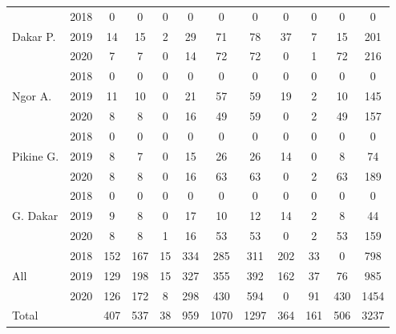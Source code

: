 \begin{tabular}{llcccc|cccccc}
\hline \multirow{3}{*}{Dakar P.} & 2018&           0&           0&           0&           0&           0&           0&           0&           0&           0&           0\\
& 2019      &          14&          15&           2&          29&          71&          78&          37&           7&          15&         201\\
& 2020      &           7&           7&           0&          14&          72&          72&           0&           1&          72&         216\\
\hline \multirow{3}{*}{Ngor A.} & 2018&           0&           0&           0&           0&           0&           0&           0&           0&           0&           0\\
& 2019      &          11&          10&           0&          21&          57&          59&          19&           2&          10&         145\\
& 2020      &           8&           8&           0&          16&          49&          59&           0&           2&          49&         157\\
\hline \multirow{3}{*}{Pikine G.} & 2018&           0&           0&           0&           0&           0&           0&           0&           0&           0&           0\\
& 2019      &           8&           7&           0&          15&          26&          26&          14&           0&           8&          74\\
& 2020      &           8&           8&           0&          16&          63&          63&           0&           2&          63&         189\\
\hline \multirow{3}{*}{G. Dakar} & 2018&           0&           0&           0&           0&           0&           0&           0&           0&           0&           0\\
& 2019      &           9&           8&           0&          17&          10&          12&          14&           2&           8&          44\\
& 2020      &           8&           8&           1&          16&          53&          53&           0&           2&          53&         159\\
\hline \multirow{3}{*}{All} & 2018&         152&         167&          15&         334&         285&         311&         202&          33&           0&         798\\
& 2019      &         129&         198&          15&         327&         355&         392&         162&          37&          76&         985\\
& 2020      &         126&         172&           8&         298&         430&         594&           0&          91&         430&        1454\\
\hline Total &&         407&         537&          38&         959&        1070&        1297&         364&         161&         506&        3237\\
\hline \end{tabular}

